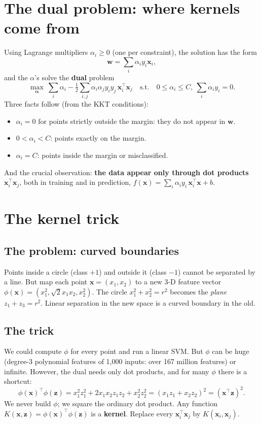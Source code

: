 \section{The dual problem: where kernels come from}
Using Lagrange multipliers $\alpha_i\ge0$ (one per constraint), the solution has the form
\[ \mathbf w = \sum_i\alpha_iy_i\mathbf x_i, \]
and the $\alpha$'s solve the \textbf{dual} problem
\[ \max_{\boldsymbol\alpha}\ \sum_i\alpha_i - \tfrac12\sum_{i,j}\alpha_i\alpha_jy_iy_j\,\mathbf x_i^\top\mathbf x_j\quad\text{s.t.}\quad 0\le\alpha_i\le C,\ \sum_i\alpha_iy_i = 0. \]
Three facts follow (from the KKT conditions):
\begin{itemize}
\item $\alpha_i = 0$ for points strictly outside the margin: they do not appear in $\mathbf w$.
\item $0 < \alpha_i < C$: points exactly on the margin.
\item $\alpha_i = C$: points inside the margin or misclassified.
\end{itemize}
And the crucial observation: \textbf{the data appear only through dot products} $\mathbf x_i^\top\mathbf x_j$, both in training and in
prediction, $f(\mathbf x) = \sum_i\alpha_iy_i\,\mathbf x_i^\top\mathbf x + b$.

\section{The kernel trick}
\subsection{The problem: curved boundaries}
Points inside a circle (class $+1$) and outside it (class $-1$) cannot be separated by a line. But map each point
$\mathbf x = (x_1, x_2)$ to a new 3-D feature vector $\phi(\mathbf x) = (x_1^2, \sqrt2x_1x_2, x_2^2)$. The circle $x_1^2 + x_2^2 = r^2$
becomes the \emph{plane} $z_1 + z_3 = r^2$. Linear separation in the new space is a curved boundary in the old.

\subsection{The trick}
We could compute $\phi$ for every point and run a linear SVM. But $\phi$ can be huge (degree-3 polynomial features of 1{,}000 inputs:
over 167 million features) or infinite. However, the dual needs only dot products, and for many $\phi$ there is a shortcut:
\[ \phi(\mathbf x)^\top\phi(\mathbf z) = x_1^2z_1^2 + 2x_1x_2z_1z_2 + x_2^2z_2^2 = (x_1z_1 + x_2z_2)^2 = (\mathbf x^\top\mathbf z)^2. \]
We never build $\phi$; we square the ordinary dot product. Any function $K(\mathbf x,\mathbf z) = \phi(\mathbf x)^\top\phi(\mathbf z)$ is a
\textbf{kernel}. Replace every $\mathbf x_i^\top\mathbf x_j$ by $K(\mathbf x_i,\mathbf x_j)$.


